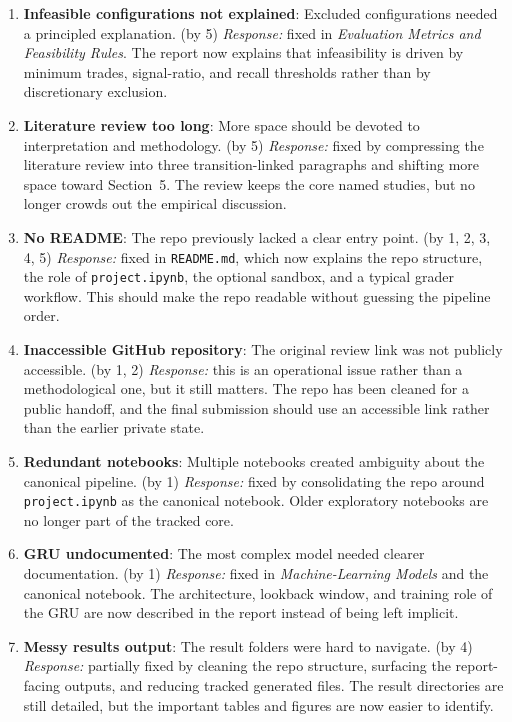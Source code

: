 \documentclass[12pt]{article}
\begin{document}
\begin{enumerate}[leftmargin=1.5em]
    \item \textbf{Infeasible configurations not explained}: Excluded configurations needed a principled explanation. (by 5) \textit{Response:} fixed in \emph{Evaluation Metrics and Feasibility Rules}. The report now explains that infeasibility is driven by minimum trades, signal-ratio, and recall thresholds rather than by discretionary exclusion.
    \item \textbf{Literature review too long}: More space should be devoted to interpretation and methodology. (by 5) \textit{Response:} fixed by compressing the literature review into three transition-linked paragraphs and shifting more space toward Section~5. The review keeps the core named studies, but no longer crowds out the empirical discussion.
    \item \textbf{No README}: The repo previously lacked a clear entry point. (by 1, 2, 3, 4, 5) \textit{Response:} fixed in \texttt{README.md}, which now explains the repo structure, the role of \texttt{project.ipynb}, the optional sandbox, and a typical grader workflow. This should make the repo readable without guessing the pipeline order.
    \item \textbf{Inaccessible GitHub repository}: The original review link was not publicly accessible. (by 1, 2) \textit{Response:} this is an operational issue rather than a methodological one, but it still matters. The repo has been cleaned for a public handoff, and the final submission should use an accessible link rather than the earlier private state.
    \item \textbf{Redundant notebooks}: Multiple notebooks created ambiguity about the canonical pipeline. (by 1) \textit{Response:} fixed by consolidating the repo around \texttt{project.ipynb} as the canonical notebook. Older exploratory notebooks are no longer part of the tracked core.
    \item \textbf{GRU undocumented}: The most complex model needed clearer documentation. (by 1) \textit{Response:} fixed in \emph{Machine-Learning Models} and the canonical notebook. The architecture, lookback window, and training role of the GRU are now described in the report instead of being left implicit.
    \item \textbf{Messy results output}: The result folders were hard to navigate. (by 4) \textit{Response:} partially fixed by cleaning the repo structure, surfacing the report-facing outputs, and reducing tracked generated files. The result directories are still detailed, but the important tables and figures are now easier to identify.

\end{enumerate}
\end{document}
